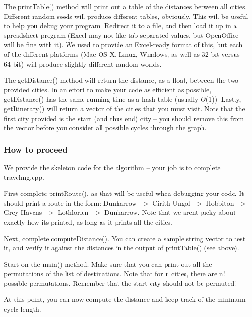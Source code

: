 The {\ttfamily print\+Table()} method will print out a table of the distances between all cities. Different random seeds will produce different tables, obviously. This will be useful to help you debug your program. Redirect it to a file, and then load it up in a spreadsheet program (Excel may not like tab-\/separated values, but Open\+Office will be fine with it). We used to provide an Excel-\/ready format of this, but each of the different platforms (Mac OS X, Linux, Windows, as well as 32-\/bit versus 64-\/bit) will produce slightly different random worlds.

The {\ttfamily get\+Distance()} method will return the distance, as a float, between the two provided cities. In an effort to make your code as efficient as possible, {\ttfamily get\+Distance()} has the same running time as a hash table (usually {$\Theta$}(1)). Lastly, {\ttfamily get\+Itinerary()} will return a vector of the cities that you must visit. Note that the first city provided is the start (and thus end) city -- you should remove this from the vector before you consider all possible cycles through the graph.

\subsubsection*{How to proceed}

We provide the skeleton code for the algorithm -- your job is to complete traveling.\+cpp.


\begin{DoxyEnumerate}
\item First complete {\ttfamily print\+Route()}, as that will be useful when debugging your code. It should print a route in the form\+: {\ttfamily Dunharrow -\/$>$ Cirith Ungol -\/$>$ Hobbiton -\/$>$ Grey Havens -\/$>$ Lothlorien -\/$>$ Dunharrow}. Note that we aren\textquotesingle{}t picky about exactly how it\textquotesingle{}s printed, as long as it prints all the cities.
\item Next, complete {\ttfamily compute\+Distance()}. You can create a sample string vector to test it, and verify it against the distances in the output of {\ttfamily print\+Table()} (see above).
\item Start on the {\ttfamily main()} method. Make sure that you can print out all the permutations of the list of destinations. Note that for n cities, there are n! possible permutations. Remember that the start city should not be permuted!
\item At this point, you can now compute the distance and keep track of the minimum cycle length.
\end{DoxyEnumerate}

